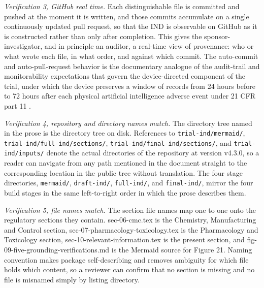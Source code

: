 \textit{Verification 3, GitHub real time.} Each distinguishable file is committed
and pushed at the moment it is written, and those commits accumulate on a single
continuously updated pull request, so that the IND is observable on GitHub as it is
constructed rather than only after completion. This gives the sponsor-investigator,
and in principle an auditor, a real-time view of provenance: who or what wrote each
file, in what order, and against which commit. The auto-commit and
auto-pull-request behavior is the documentary analogue of the audit-trail and
monitorability expectations that govern the device-directed component of the trial,
under which the device preserves a window of records from 24 hours before to 72
hours after each physical artificial intelligence adverse event under 21 CFR part
11 \cite{paiautospons, paisitedocpk}.

\textit{Verification 4, repository and directory names match.} The directory tree
named in the prose is the directory tree on disk. References to
\texttt{trial-ind/mermaid/}, \texttt{trial-ind/full-ind/sections/},
\texttt{trial-ind/final-ind/sections/}, and \texttt{trial-ind/inputs/} denote the
actual directories of the repository at version v4.3.0, so a reader can navigate
from any path mentioned in the document straight to the corresponding location in
the public tree without translation. The four stage directories, \texttt{mermaid/},
\texttt{draft-ind/}, \texttt{full-ind/}, and \texttt{final-ind/}, mirror the four
build stages in the same left-to-right order in which the prose describes them.

\textit{Verification 5, file names match.} The section file names map one to one
onto the regulatory sections they contain. sec-06-cmc.tex is the
Chemistry, Manufacturing and Control section, sec-07-pharmacology-toxicology.tex
is the Pharmacology and Toxicology section, sec-10-relevant-information.tex
is the present section, and fig-09-five-grounding-verifications.md is the
Mermaid source for Figure 21. Naming convention makes package
self-describing and removes ambiguity for which file holds which content, so a
reviewer can confirm that no section is missing and no file is misnamed simply by
listing directory.

